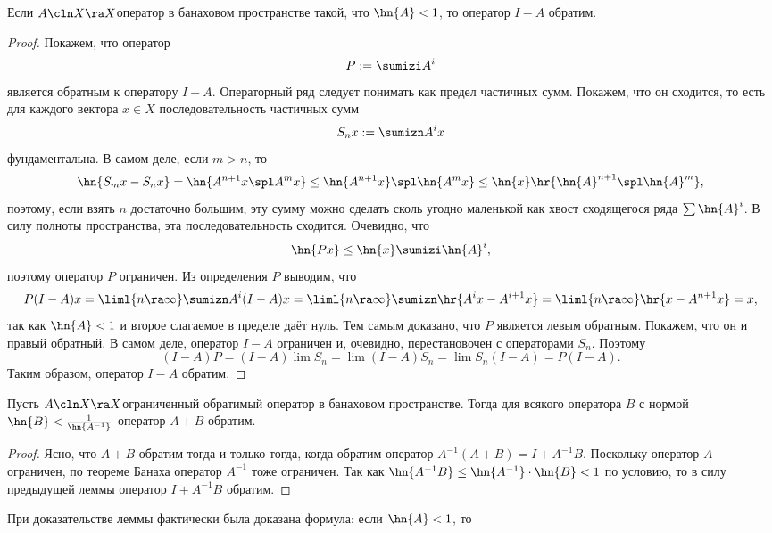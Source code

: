 \documentclass[a4paper]{article}
\begin{document}
\begin{lemma}
Если $A\cln X \ra X$\т оператор в банаховом пространстве такой, что $\hn{A} < 1$, то оператор $I - A$ обратим.
\end{lemma}
\begin{proof}
Покажем, что оператор
$$P := \sumizi A^i$$
является обратным к оператору $I - A$. Операторный ряд следует понимать как предел частичных сумм.
Покажем, что он сходится, то есть для каждого вектора $x \in X$
последовательность частичных сумм
$$
  S_n x := \sumizn A^ix
$$
фундаментальна.
В самом деле, если $m>n$, то
$$
  \hn{S_m x - S_n x} = \hn{A^{n+1}x\spl A^m x} \le \hn{A^{n+1}x}\spl \hn{A^m x}\le
  \hn{x} \hr{\hn{A}^{n+1}\spl \hn{A}^m},
$$
поэтому, если взять $n$ достаточно большим, эту сумму можно сделать сколь угодно маленькой
как хвост сходящегося ряда $\sum\hn{A}^i$.
В силу полноты пространства, эта последовательность сходится. Очевидно, что
$$\hn{Px} \le \hn{x} \sumizi \hn{A}^i,$$
поэтому оператор $P$ ограничен.
Из определения $P$ выводим, что
$$P(I-A)x = \liml{n \ra \infty} \sumizn A^i(I-A)x = \liml{n\ra\infty}\sumizn\hr{A^ix - A^{i+1}x}
= \liml{n\ra\infty} \hr{x-A^{n+1}x} = x,$$
так как $\hn{A}<1$ и второе слагаемое в пределе даёт нуль. Тем самым доказано, что
$P$ является левым обратным. Покажем, что он и правый обратный.
В самом деле, оператор $I-A$ ограничен и, очевидно, перестановочен с операторами $S_n$.
Поэтому
$$(I - A)P = (I-A)\lim S_n = \lim (I-A)S_n = \lim S_n(I-A) = P(I-A).$$
Таким образом, оператор $I-A$ обратим.
\end{proof}

\begin{theorem}
\label{th:resolveness.under.small.pert}
Пусть $A\cln X \ra X$\т ограниченный обратимый оператор в банаховом пространстве. Тогда
для всякого оператора $B$ с нормой $\hn{B} < \frac{1}{\hn{A^{-1}}}$ оператор $A + B$ обратим.
\end{theorem}
\begin{proof}
Ясно, что $A+B$ обратим тогда и только тогда, когда обратим оператор $A^{-1}(A+B) = I + A^{-1}B$.
Поскольку оператор $A$ ограничен, по теореме Банаха оператор $A^{-1}$ тоже ограничен.
Так как $\hn{A^{-1}B} \le \hn{A^{-1}} \cdot \hn{B} < 1$ по условию, то в силу предыдущей леммы
оператор $I + A^{-1}B$ обратим.
\end{proof}

При доказательстве леммы фактически была доказана формула: если $\hn{A} < 1$, то
\end{document}
